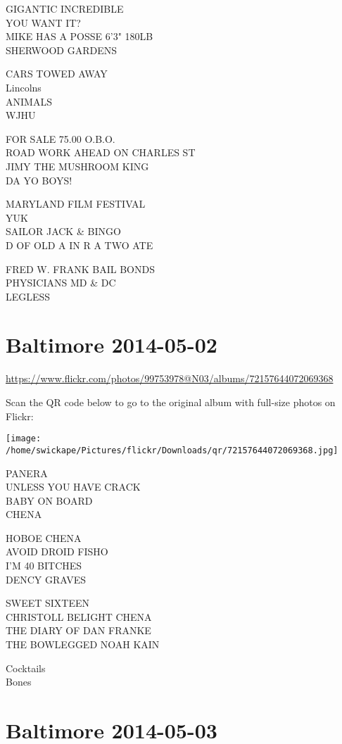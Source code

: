 \documentclass[10pt,letterpaper]{article}
\begin{document}
GIGANTIC INCREDIBLE\\
YOU WANT IT?\\
MIKE HAS A POSSE 6'3" 180LB\\
SHERWOOD GARDENS

CARS TOWED AWAY\\
Lincolns\\
ANIMALS\\
WJHU

FOR SALE 75.00 O.B.O.\\
ROAD WORK AHEAD ON CHARLES ST\\
JIMY THE MUSHROOM KING\\
DA YO BOYS!

MARYLAND FILM FESTIVAL\\
YUK\\
SAILOR JACK \& BINGO\\
D OF OLD A IN R A TWO ATE

FRED W. FRANK BAIL BONDS\\
PHYSICIANS MD \& DC\\
LEGLESS
\pagebreak

\section*{Baltimore 2014-05-02}

\url{https://www.flickr.com/photos/99753978@N03/albums/72157644072069368}

Scan the QR code below to go to the original album with full-size photos on Flickr:

\texttt{[image: /home/swickape/Pictures/flickr/Downloads/qr/72157644072069368.jpg]}
\pagebreak

PANERA\\
UNLESS YOU HAVE CRACK\\
BABY ON BOARD\\
CHENA

HOBOE CHENA\\
AVOID DROID FISHO\\
I'M 40 BITCHES\\
DENCY GRAVES

SWEET SIXTEEN\\
CHRISTOLL BELIGHT CHENA\\
THE DIARY OF DAN FRANKE\\
THE BOWLEGGED NOAH KAIN

Cocktails\\
Bones
\pagebreak

\section*{Baltimore 2014-05-03}
\end{document}

